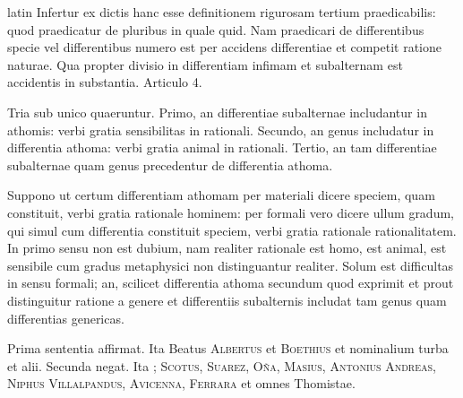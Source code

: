\begin{otherlanguage*}{latin}
\pstart
Infertur ex dictis hanc esse definitionem rigurosam tertium praedicabilis:
quod praedicatur de pluribus in quale quid. Nam praedicari de differentibus specie vel differentibus numero est per accidens differentiae et competit ratione naturae. Qua propter divisio in differentiam infimam et subalternam est accidentis in substantia. Articulo 4. 
\pend

\pstart
{}
\pend

\pstart
Tria sub unico quaeruntur. Primo, an differentiae subalternae includantur in athomis:
verbi gratia sensibilitas in rationali. Secundo, an genus includatur in differentia athoma:
verbi gratia animal in rationali. Tertio, an tam differentiae subalternae quam genus precedentur de differentia athoma. 
\pend

\pstart
Suppono ut certum differentiam athomam per materiali dicere speciem, quam constituit, verbi gratia rationale hominem:
per formali vero dicere ullum gradum, qui simul cum differentia constituit speciem, verbi gratia rationale rationalitatem. In primo sensu non est dubium, nam realiter rationale est homo, est animal, est sensibile cum gradus metaphysici non distinguantur realiter. Solum est difficultas in sensu formali; an, scilicet differentia athoma secundum quod exprimit et prout distinguitur ratione a genere et differentiis subalternis includat tam genus quam differentias genericas. 
\pend

\pstart
Prima sententia affirmat. Ita  Beatus \textsc{Albertus} et \textsc{Boethius} et nominalium turba et alii. Secunda negat. Ita ; \textsc{Scotus}, \textsc{Suarez}, \textsc{Oña}, \textsc{Masius}, \textsc{Antonius Andreas}, \textsc{Niphus} \textsc{Villalpandus}, \textsc{Avicenna}, \textsc{Ferrara} et omnes Thomistae. 
\pend


\end{otherlanguage*}
